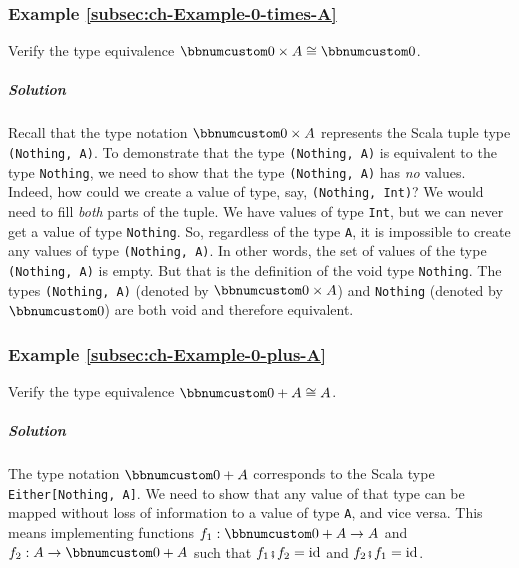 \subsubsection{Example \label{subsec:ch-Example-0-times-A}\ref{subsec:ch-Example-0-times-A}}

Verify the type equivalence $\bbnum 0\times A\cong\bbnum 0$.

\subparagraph{Solution}

Recall that the type notation $\bbnum 0\times A$ represents the Scala
tuple type \lstinline!(Nothing, A)!. To demonstrate that the type
\lstinline!(Nothing, A)! is equivalent to the type \lstinline!Nothing!,
we need to show that the type \lstinline!(Nothing, A)! has \emph{no}
values. Indeed, how could we create a value of type, say, \lstinline!(Nothing, Int)!?
We would need to fill \emph{both} parts of the tuple. We have values
of type \lstinline!Int!, but we can never get a value of type \lstinline!Nothing!.
So, regardless of the type \lstinline!A!, it is impossible to create
any values of type \lstinline!(Nothing, A)!. In other words, the
set of values of the type \lstinline!(Nothing, A)! is empty. But
that is the definition of the void type \lstinline!Nothing!. The
types \lstinline!(Nothing, A)! (denoted by $\bbnum 0\times A$) and
\lstinline!Nothing! (denoted by $\bbnum 0$) are both void and therefore
equivalent.

\subsubsection{Example \label{subsec:ch-Example-0-plus-A}\ref{subsec:ch-Example-0-plus-A}}

Verify the type equivalence $\bbnum 0+A\cong A$.

\subparagraph{Solution}

The type notation $\bbnum 0+A$ corresponds to the Scala type \lstinline!Either[Nothing, A]!.
We need to show that any value of that type can be mapped without
loss of information to a value of type \lstinline!A!, and vice versa.
This means implementing functions $f_{1}:\bbnum 0+A\rightarrow A$
and $f_{2}:A\rightarrow\bbnum 0+A$ such that $f_{1}\bef f_{2}=\text{id}$
and $f_{2}\bef f_{1}=\text{id}$.

